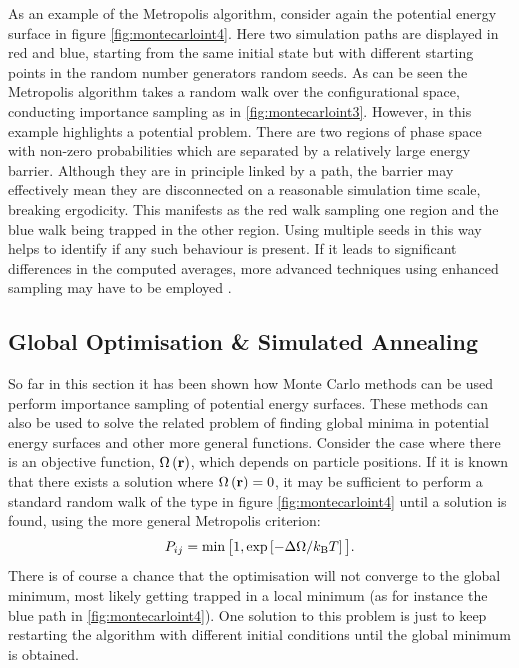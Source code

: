 As an example of the Metropolis algorithm, consider again the \td{} potential energy surface in figure \ref{fig:montecarloint4}.
Here two simulation paths are displayed in red and blue, starting from the same initial state but with different starting points in the random number generators \ie{} random seeds.
As can be seen the Metropolis algorithm takes a random walk over the configurational space, conducting importance sampling as in \ref{fig:montecarloint3}.
However, in this example highlights a potential problem.
There are two regions of phase space with non\--zero probabilities which are separated by a relatively large energy barrier.
Although they are in principle linked by a path, the barrier may effectively mean they are disconnected on a reasonable simulation time scale, breaking ergodicity.
This manifests as the red walk sampling one region and the blue walk being trapped in the other region.
Using multiple seeds in this way helps to identify if any such behaviour is present.
If it leads to significant differences in the computed averages, more advanced techniques using enhanced sampling may have to be employed \cite{Torrie1977,Earl2005}.

\subsection{Global Optimisation \& Simulated Annealing}
\label{s:simulatedannealing}

So far in this section it has been shown how Monte Carlo methods can be used perform importance sampling of potential energy surfaces.
These methods can also be used to solve the related problem of finding global minima in potential energy surfaces and other more general functions.
Consider the case where there is an objective function, $\Omega\left(\mathbf{r}\right)$, which depends on particle positions.
If it is known that there exists a solution where $\Omega\left(\mathbf{r}\right)=0$, it may be sufficient to perform a standard random walk of the type in figure \ref{fig:montecarloint4} until a solution is found, using the more general Metropolis criterion:
\begin{equation}
	\label{eq:objmetropolis}
	P_{ij} = \min\big[1,\exp\left[-\Delta\Omega/k_\text{B} T\right]\big].
\end{equation}
There is of course a chance that the optimisation will not converge to the global minimum, most likely getting trapped in a local minimum (as for instance the blue path in \ref{fig:montecarloint4}).
One solution to this problem is just to keep restarting the algorithm with different initial conditions until the global minimum is obtained.

